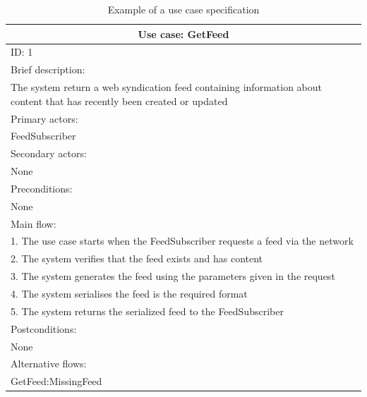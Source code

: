 \documentclass{article}
\begin{document}
\begin{table}[]
\begin{center}
\begin{tabular}{ | p{\textwidth} |}
\hline
\multicolumn{1}{|c|}{Use case: GetFeed} \\
\hline
ID: 1 \\
\hline
Brief description: \\
The system return a web syndication feed containing information about content that has recently been created or updated \\
\hline
Primary actors: \\
FeedSubscriber \\
\hline
Secondary actors: \\
None \\
\hline
Preconditions: \\
None \\
\hline
Main flow: \\
1. The use case starts when the FeedSubscriber requests a feed via the network \\
2. The system verifies that the feed exists and has content \\
3. The system generates the feed using the parameters given in the request \\
4. The system serialises the feed is the required format \\
5. The system returns the serialized feed to the FeedSubscriber \\
\hline
Postconditions: \\
None \\
\hline
Alternative flows: \\
GetFeed:MissingFeed \\
\hline
\end{tabular}
\end{center}
\caption{Example of a use case specification}
\label{use-case-detail}
\end{table}
\end{document}
